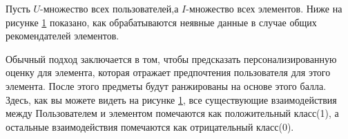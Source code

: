 Пусть ${U}$-множество всех пользователей,а ${I}$-множество всех 
элементов. Ниже на рисунке \ref{BPR1} показано, как обрабатываются неявные 
данные в случае общих рекомендателей элементов.
\begin{figure}[ht]
    \begin{center}
    
    \caption{
    \label{BPR1}
         }
    \end {center}
    \end {figure}
    Обычный подход заключается в том, чтобы предсказать
     персонализированную оценку для элемента, которая отражает 
     предпочтения пользователя для этого элемента. После этого 
     предметы будут ранжированы на основе этого балла. Здесь,
      как вы можете видеть на рисунке \ref{BPR1}, все существующие 
      взаимодействия между Пользователем и элементом помечаются как 
      положительный класс(1), а остальные взаимодействия помечаются
      как отрицательный класс(0).


